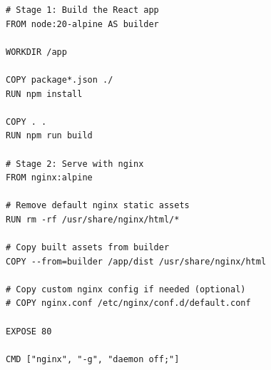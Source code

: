 \documentclass[../BTL.tex]{subfiles}
\begin{document}
\begin{verbatim}
# Stage 1: Build the React app
FROM node:20-alpine AS builder

WORKDIR /app

COPY package*.json ./
RUN npm install

COPY . .
RUN npm run build

# Stage 2: Serve with nginx
FROM nginx:alpine

# Remove default nginx static assets
RUN rm -rf /usr/share/nginx/html/*

# Copy built assets from builder
COPY --from=builder /app/dist /usr/share/nginx/html

# Copy custom nginx config if needed (optional)
# COPY nginx.conf /etc/nginx/conf.d/default.conf

EXPOSE 80

CMD ["nginx", "-g", "daemon off;"]
\end{verbatim}
\end{document}
